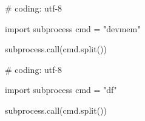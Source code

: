 \begin{mylisting}[label={lst:acpid},language=sh,caption=devmem]

# coding: utf-8

import subprocess
cmd = "devmem"

subprocess.call(cmd.split())

\end{mylisting}

\begin{mylisting}[label={lst:acpid},language=sh,caption=df]

# coding: utf-8

import subprocess
cmd = "df"

subprocess.call(cmd.split())

\end{mylisting}

